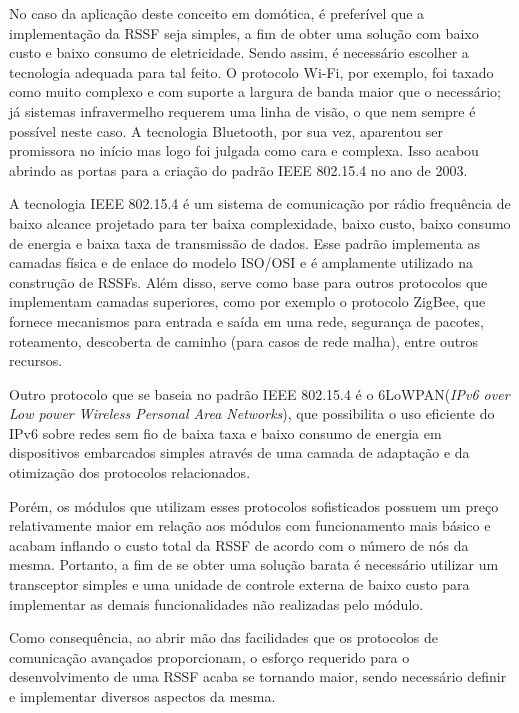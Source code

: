 \documentclass[
    12pt,               %
    a4paper,            %
    english,            %
    brazil,             %
    ]{article}
\begin{document}
No caso da aplicação deste conceito em domótica, é preferível que a implementação da RSSF seja simples, a fim de obter uma solução
com baixo custo e baixo consumo de eletricidade. Sendo assim, é necessário escolher a tecnologia adequada para tal feito. O
protocolo Wi-Fi, por exemplo, foi taxado como muito complexo e com suporte a largura de banda maior que o necessário; já sistemas
infravermelho requerem uma linha de visão, o que nem sempre é possível neste caso. A tecnologia Bluetooth, por sua vez, aparentou
ser promissora no início mas logo foi julgada como cara e complexa. Isso acabou abrindo as portas para a criação do padrão IEEE
802.15.4 no ano de 2003.  \cite{sohraby_minoli_znati2007}

A tecnologia IEEE 802.15.4 é um sistema de comunicação por rádio frequência de baixo alcance projetado para ter baixa
complexidade, baixo custo, baixo consumo de energia e baixa taxa de transmissão de dados. Esse padrão implementa as camadas física
e de enlace do modelo ISO/OSI e é amplamente utilizado na construção de RSSFs. Além disso, serve como base para outros protocolos
que implementam camadas superiores, como por exemplo o protocolo ZigBee, que fornece mecanismos para entrada e saída em uma rede,
segurança de pacotes, roteamento, descoberta de caminho (para casos de rede malha), entre outros recursos. \cite{buratti2011}

Outro protocolo que se baseia no padrão IEEE 802.15.4 é o 6LoWPAN(\textit{IPv6 over Low power Wireless Personal Area Networks}),
que possibilita o uso eficiente do IPv6 sobre redes sem fio de baixa taxa e baixo consumo de energia em dispositivos embarcados
simples através de uma camada de adaptação e da otimização dos protocolos relacionados. \cite{shelby_bormann2009}

Porém, os módulos que utilizam esses protocolos sofisticados possuem um preço relativamente maior em relação aos módulos com
funcionamento mais básico e acabam inflando o custo total da RSSF de acordo com o número de nós da mesma. Portanto, a fim de se
obter uma solução barata é necessário utilizar um transceptor simples e uma unidade de controle externa de baixo custo para
implementar as demais funcionalidades não realizadas pelo módulo.

Como consequência, ao abrir mão das facilidades que os protocolos de comunicação avançados proporcionam, o esforço requerido para
o desenvolvimento de uma RSSF acaba se tornando maior, sendo necessário definir e implementar diversos aspectos da mesma.
\end{document}
